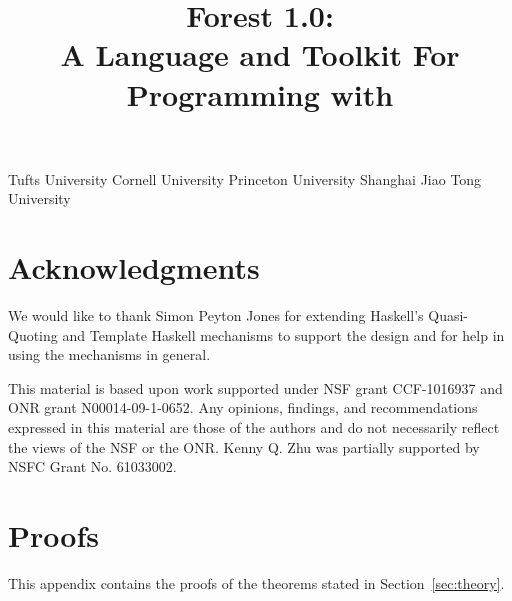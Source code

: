 \documentclass[natbib]{sigplanconf}
\newif\ifappendix\appendixtrue   %
\newif\ifanon\anonfalse          %
\begin{document}


\copyrightdata{} 

\title{Forest 1.0: \\ A Language and Toolkit For Programming with \Filestores{}}

\ifanon
\authorinfo{\vskip -2in}
 	   {\vskip -2in}
           {}
\else
{}
	   {Tufts University}{}
           {Cornell University}{}
           {Princeton University}{}
           {Shanghai Jiao Tong University}{}
\fi

\maketitle{}

\begin{abstract}  

\end{abstract}












\section*{Acknowledgments}
We would like to thank Simon Peyton Jones for extending Haskell's
Quasi-Quoting and Template Haskell mechanisms to support the \forest{}
design and for help in using the mechanisms in general.

This material is based upon work supported under NSF grant CCF-1016937
and ONR grant N00014-09-1-0652. Any opinions, findings, and
recommendations expressed in this material are those of the authors
and do not necessarily reflect the views of the NSF or the ONR.
Kenny Q. Zhu was partially supported by NSFC Grant No. 61033002.


\balance


\ifappendix
\onecolumn
\newpage
\appendix

\closeproofchan
\section{Proofs}

\noindent This appendix contains the proofs of the theorems stated in
Section~\ref{sec:theory}.

\label{sec:proof-appendix}



\fi
\end{document}
